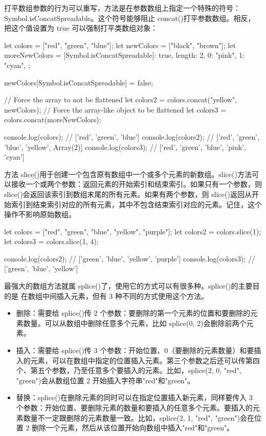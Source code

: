 打平数组参数的行为可以重写，方法是在参数数组上指定一个特殊的符号：Symbol.isConcatSpreadable。这个符号能够阻止 concat()打平参数数组。相反，把这个值设置为 true 可以强制打平类数组对象：
\begin{js}
    let colors = ["red", "green", "blue"];
    let newColors = ["black", "brown"];
    let moreNewColors = {
    [Symbol.isConcatSpreadable]: true,
    length: 2,
    0: "pink",
    1: "cyan",
    };

    newColors[Symbol.isConcatSpreadable] = false;

    // Force the array to not be flattened
    let colors2 = colors.concat("yellow", newColors);
    // Force the array-like object to be flattened
    let colors3 = colors.concat(moreNewColors);

    console.log(colors); // ['red', 'green', 'blue']
    console.log(colors2); // ['red', 'green', 'blue', 'yellow', Array(2)]
    console.log(colors3); //  ['red', 'green', 'blue', 'pink', 'cyan']
\end{js}

方法 slice()用于创建一个包含原有数组中一个或多个元素的新数组。slice()方法可以接收一个或两个参数：返回元素的开始索引和结束索引。如果只有一个参数，则 slice()会返回该索引到数组末尾的所有元素。如果有两个参数，则 slice()返回从开始索引到结束索引对应的所有元素，其中不包含结束索引对应的元素。记住，这个操作不影响原始数组。

\begin{js}
    let colors = ["red", "green", "blue", "yellow", "purple"];
    let colors2 = colors.slice(1);
    let colors3 = colors.slice(1, 4);

    console.log(colors2); // ['green', 'blue', 'yellow', 'purple']
    console.log(colors3); // ['green', 'blue', 'yellow']
\end{js}

最强大的数组方法就属 splice()了，使用它的方式可以有很多种。splice()的主要目的是
在数组中间插入元素，但有 3 种不同的方式使用这个方法。
\begin{itemize}
    \item 删除：需要给 splice()传 2 个参数：要删除的第一个元素的位置和要删除的元素数量。可以从数组中删除任意多个元素，比如 splice(0, 2)会删除前两个元素。
    \item 插入：需要给 splice()传 3 个参数：开始位置、0（要删除的元素数量）和要插入的元素，可以在数组中指定的位置插入元素。第三个参数之后还可以传第四个、第五个参数，乃至任意多个要插入的元素。比如，splice(2, 0, "red", "green")会从数组位置 2 开始插入字符串"red"和"green"。
    \item 替换：splice()在删除元素的同时可以在指定位置插入新元素，同样要传入 3 个参数：开始位置、要删除元素的数量和要插入的任意多个元素。要插入的元素数量不一定跟删除的元素数量一致。比如，splice(2, 1, "red", "green")会在位置 2 删除一个元素，然后从该位置开始向数组中插入"red"和"green"。
\end{itemize}

